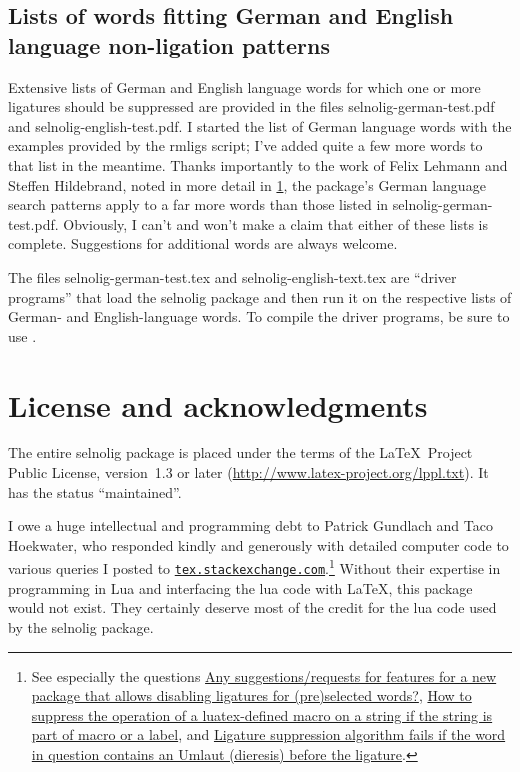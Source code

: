 \documentclass[11pt]{article}
\newcommand{\pkg}[1]{\textsf{#1}}
\begin{document}
\subsection{Lists of words fitting German and English language non-ligation patterns}

Extensive lists of German and English language words for which one or more ligatures should be suppressed are provided in the files \pkg{selnolig-german-test.pdf} and \pkg{selnolig-english-test.pdf}. I started the list of German language words with the examples provided by the \pkg{rmligs} script; I've added quite a few more words to that list in the meantime. Thanks importantly to the work of Felix Lehmann and Steffen Hildebrand, noted in more detail in \cref{sec:thanks}, the package's German language search patterns apply to a far more words than those listed in \pkg{selnolig-german-test.pdf}. Obviously, I can't and won't make a claim that either of these lists is complete. Suggestions for additional words are always welcome.

The files \pkg{selnolig-german-test.tex} and \pkg{selnolig-english-text.tex} are \enquote{driver programs} that load the \pkg{selnolig} package and then run it on the respective lists of German- and English-language words. To compile the driver programs, be sure to use \LuaLaTeX.

\section{License and acknowledgments} \label{sec:thanks}

The entire \pkg{selnolig} package is placed under the terms of the \LaTeX\ Project Public License, version~1.3 or later (\url{http://www.latex-project.org/lppl.txt}).
It has the status \enquote{maintained}.

\bigskip
I owe a huge intellectual and programming debt to Patrick Gundlach and Taco Hoekwater, who responded kindly and generously with detailed computer code to various queries I posted to \href{http://tex.stackexchange.com}{\texttt{tex.stackexchange.com}}.\footnote{See especially the questions \href{http://tex.stackexchange.com/q/37443/5001}{Any suggestions/requests for features for a new package that allows disabling ligatures for (pre)selected words?}, \href{http://tex.stackexchange.com/q/48516/5001}{How to suppress the operation of a luatex-defined macro on a string if the string is part of macro or a label}, and \href{http://tex.stackexchange.com/q/63005/5001}{Ligature suppression algorithm fails if the word in question contains an Umlaut (dieresis) before the ligature}.} Without their expertise in programming in Lua and interfacing the lua code with \LaTeX, this package would not exist. They certainly deserve most of the credit for the lua code used by the \pkg{selnolig} package.
\end{document}
